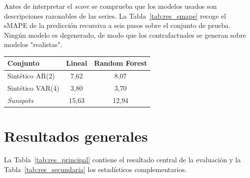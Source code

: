 \documentclass[12pt]{report} %
\begin{document}
Antes de interpretar el \textit{score} se comprueba que los modelos usados son descripciones razonables de las series. La Tabla~\ref{tab:res_smape} recoge el sMAPE de la predicción recursiva a seis pasos sobre el conjunto de prueba. Ningún modelo es degenerado, de modo que los contrafactuales se generan sobre modelos "realistas".

\begin{table}[H]
    {\begin{tabular}{|p{3.6cm}|c|c|}
            \hline
            \textbf{Conjunto} & \textbf{Lineal} & \textbf{Random Forest} \\
            \hline
            Sintético AR(2)   & 7{,}62          & 8{,}07                 \\
            \hline
            Sintético VAR(4)  & 3{,}80          & 3{,}70                 \\
            \hline
            \textit{Sunspots} & 15{,}63         & 12{,}94                \\
            \hline
        \end{tabular}}
\end{table}

\section{Resultados generales}

La Tabla~\ref{tab:res_principal} contiene el resultado central de la evaluación y la Tabla~\ref{tab:res_secundaria} los estadísticos complementarios.
\end{document}
